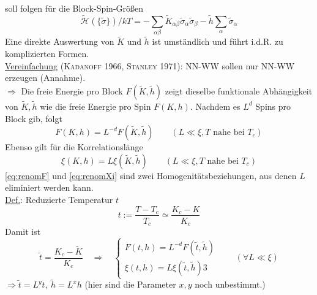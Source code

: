 \begin{enumerate}[A)]
    soll folgen für die Block-Spin-Größen
    \begin{equation}
        \tilde{\mathscr{H}} \left( \{ \tilde{\sigma} \} \right)  /kT = - \sum_{\alpha \beta} \tilde{K}_{\alpha \beta} \tilde{\sigma}_\alpha \tilde{\sigma}_\beta - \tilde{h} \sum_\alpha \tilde{\sigma}_\alpha
    \end{equation}
    Eine direkte Auswertung von $\tilde{K}$ und $\tilde{h}$ ist umständlich und führt i.d.R. zu komplizierten Formen. \\
    \underline{Vereinfachung} (\textsc{Kadanoff} 1966, \textsc{Stanley} 1971): NN-WW sollen nur NN-WW erzeugen (Annahme). \\
    $\Rightarrow$ Die freie Energie pro Block $F(\tilde{K}, \tilde{h})$ zeigt dieselbe funktionale Abhängigkeit von $\tilde{K}, \tilde{h}$ wie die
    freie Energie pro Spin $F(K, h)$. Nachdem es $L^d$ Spins pro Block gib, folgt
    \begin{equation}
        \label{eq:renomF}
        F(K, h) = L^{-d}  F(\tilde{K}, \tilde{h}) \qquad \left( L \ll \xi, T \text{ nahe bei } T_c \right)
    \end{equation}
    Ebenso gilt für die Korrelationslänge
    \begin{equation}
        \label{eq:renomXi}
        \xi(K, h) = L \xi(\tilde{K}, \tilde{h})\qquad \left( L \ll \xi, T \text{ nahe bei } T_c \right)
    \end{equation}
    \autoref{eq:renomF} und \autoref{eq:renomXi} sind zwei Homogenitätsbeziehungen, aus denen $L$ eliminiert werden kann. \\
    \underline{Def.}: Reduzierte Temperatur $t$
    \begin{equation}
        t := \frac{T-T_c}{T_c} \simeq \frac{K_c - K}{K_c}
    \end{equation}
    Damit ist
    \begin{equation}
        \tilde{t} = \frac{K_c - \tilde{K}}{K_c} \quad \Rightarrow \quad
        \begin{cases}
            F(t, h) = L^{-d} F(\tilde{t}, \tilde{h}) \\
            \xi(t, h) = L \xi (\tilde{t}, \tilde{h})3
        \end{cases}
        \qquad \left( \forall L \ll \xi \right)
    \end{equation}
    $\Rightarrow \tilde{t} = L^y t, \ \tilde{h} = L^x h$ (hier sind die Parameter $x, y$ noch unbestimmt.)
    \begin{equation}
        \begin{split}

\end{split}
\end{equation}
\end{enumerate}
